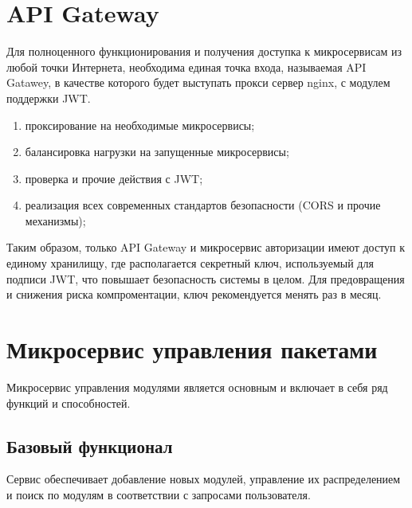 \section{API Gateway}
Для полноценного функционирования и получения доступка к микросервисам из любой точки Интернета, необходима единая точка входа, называемая API Gatawey, в качестве которого будет выступать прокси сервер nginx, с модулем поддержки JWT. \cite{arch:api}
\begin{enumerate}
    \item проксирование на необходимые микросервисы;
    \item балансировка нагрузки на запущенные микросервисы;
    \item проверка и прочие действия с JWT;
    \item реализация всех современных стандартов безопасности (CORS и прочие механизмы);
\end{enumerate}




Таким образом, только API Gateway и микросервис авторизации имеют доступ к единому хранилищу, где располагается секретный ключ, используемый для подписи JWT, что повышает безопасность системы в целом. Для предовращения и снижения риска компроментации, ключ рекомендуется менять раз в месяц. 

\section{Микросервис управления пакетами}

Микросервис управления модулями является основным и включает в себя ряд функций и способностей. 

\subsection{Базовый функционал}
Сервис обеспечивает добавление новых модулей, управление их распределением и поиск по модулям в соответствии с запросами пользователя.

